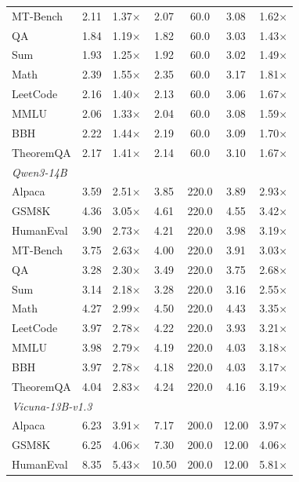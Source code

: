\documentclass[letterpaper,twocolumn,10pt]{article}
\begin{document}
\begin{table}[t]
\begin{tabular}{lcccccc}
MT-Bench    & 2.11 & 1.37$\times$ & 2.07 & 60.0 & 3.08 & 1.62$\times$ \\
QA          & 1.84 & 1.19$\times$ & 1.82 & 60.0 & 3.03 & 1.43$\times$ \\
Sum         & 1.93 & 1.25$\times$ & 1.92 & 60.0 & 3.02 & 1.49$\times$ \\
Math        & 2.39 & 1.55$\times$ & 2.35 & 60.0 & 3.17 & 1.81$\times$ \\
LeetCode    & 2.16 & 1.40$\times$ & 2.13 & 60.0 & 3.06 & 1.67$\times$ \\
MMLU        & 2.06 & 1.33$\times$ & 2.04 & 60.0 & 3.08 & 1.59$\times$ \\
BBH         & 2.22 & 1.44$\times$ & 2.19 & 60.0 & 3.09 & 1.70$\times$ \\
TheoremQA   & 2.17 & 1.41$\times$ & 2.14 & 60.0 & 3.10 & 1.67$\times$ \\
\midrule
\multicolumn{7}{l}{\textit{Qwen3-14B}} \\
Alpaca      & 3.59 & 2.51$\times$ & 3.85 & 220.0 & 3.89 & 2.93$\times$ \\
GSM8K       & 4.36 & 3.05$\times$ & 4.61 & 220.0 & 4.55 & 3.42$\times$ \\
HumanEval   & 3.90 & 2.73$\times$ & 4.21 & 220.0 & 3.98 & 3.19$\times$ \\
MT-Bench    & 3.75 & 2.63$\times$ & 4.00 & 220.0 & 3.91 & 3.03$\times$ \\
QA          & 3.28 & 2.30$\times$ & 3.49 & 220.0 & 3.75 & 2.68$\times$ \\
Sum         & 3.14 & 2.18$\times$ & 3.28 & 220.0 & 3.16 & 2.55$\times$ \\
Math        & 4.27 & 2.99$\times$ & 4.50 & 220.0 & 4.43 & 3.35$\times$ \\
LeetCode    & 3.97 & 2.78$\times$ & 4.22 & 220.0 & 3.93 & 3.21$\times$ \\
MMLU        & 3.98 & 2.79$\times$ & 4.19 & 220.0 & 4.03 & 3.18$\times$ \\
BBH         & 3.97 & 2.78$\times$ & 4.18 & 220.0 & 4.03 & 3.17$\times$ \\
TheoremQA   & 4.04 & 2.83$\times$ & 4.24 & 220.0 & 4.16 & 3.19$\times$ \\
\midrule
\multicolumn{7}{l}{\textit{Vicuna-13B-v1.3}} \\
Alpaca      & 6.23 & 3.91$\times$ & 7.17  & 200.0 & 12.00 & 3.97$\times$ \\
GSM8K       & 6.25 & 4.06$\times$ & 7.30  & 200.0 & 12.00 & 4.06$\times$ \\
HumanEval   & 8.35 & 5.43$\times$ & 10.50 & 200.0 & 12.00 & 5.81$\times$ \\

\end{tabular}
\end{table}
\end{document}
